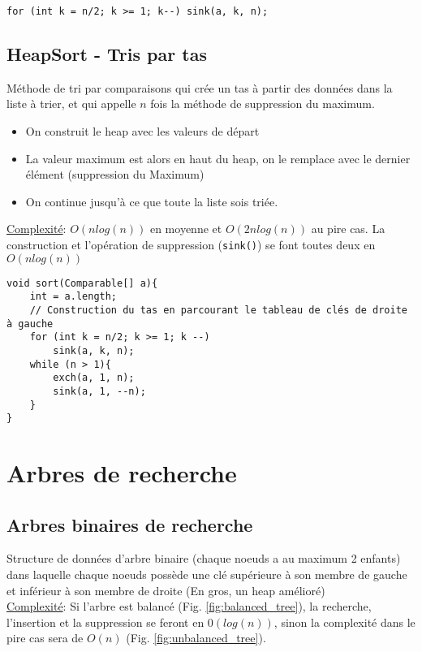 \documentclass[10pt]{article}
\begin{document}
\begin{verbatim}
for (int k = n/2; k >= 1; k--) sink(a, k, n);
\end{verbatim}

\subsection{HeapSort - Tris par tas}
Méthode de tri par comparaisons qui crée un tas à partir des données dans la liste à trier, et qui appelle $n$ fois la méthode de suppression du maximum.
\begin{itemize}
\item On construit le heap avec les valeurs de départ
\item La valeur maximum est alors en haut du heap, on le remplace avec le dernier élément (suppression du Maximum)
\item On continue jusqu'à ce que toute la liste sois triée.
\end{itemize}
\underline{Complexité}: $O(nlog(n))$ en moyenne et $O(2nlog(n))$ au pire cas. La construction et l'opération de suppression (\verb|sink()|)  se font toutes deux en $O(nlog(n))$ 

\begin{verbatim}
void sort(Comparable[] a){
	int = a.length;
	// Construction du tas en parcourant le tableau de clés de droite à gauche
	for (int k = n/2; k >= 1; k --) 
		sink(a, k, n);
	while (n > 1){
		exch(a, 1, n);
		sink(a, 1, --n);
	}
}
\end{verbatim}

\section{Arbres de recherche}
\subsection{Arbres binaires de recherche}
Structure de données d'arbre binaire (chaque noeuds a au maximum 2 enfants) dans laquelle chaque noeuds possède une clé supérieure à son membre de gauche et inférieur à son membre de droite (En gros, un heap amélioré)\\
\underline{Complexité}: Si l'arbre est balancé (Fig. \ref{fig:balanced_tree}), la recherche, l'insertion et la suppression se feront en $0(log(n))$, sinon la complexité dans le pire cas sera de $O(n)$ (Fig. \ref{fig:unbalanced_tree}).
\end{document}
